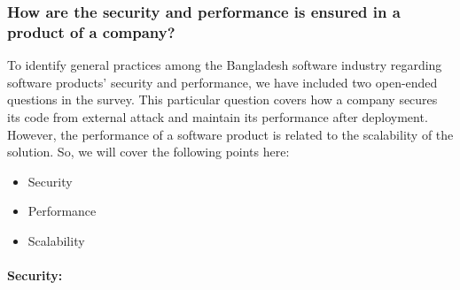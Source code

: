 \subsubsection{How are the security and performance is ensured in a product of a company?}
\label{security_performance}

To identify general practices among the Bangladesh software industry regarding software products' security and performance, we have included two open-ended questions in the survey. This particular question covers how a company secures its code from external attack and maintain its performance after deployment. However, the performance of a software product is related to the scalability of the solution. So, we will cover the following points here:
\begin{itemize}
    \item Security
    \item Performance
    \item Scalability
\end{itemize}


\paragraph{Security:}
\label{Security}


